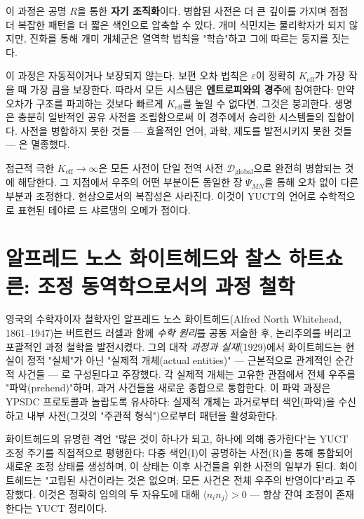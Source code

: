 \documentclass[12pt,a4paper]{article}
\newcommand{\Keff}{K_{\mathrm{eff}}}
\begin{document}
	이 과정은 공명 \(R\)을 통한 \textbf{자기 조직화}이다. 병합된 사전은 더 큰 깊이를 가지며 점점 더 복잡한 패턴을 더 짧은 색인으로 압축할 수 있다. 개미 식민지는 물리학자가 되지 않지만, 진화를 통해 개미 개체군은 열역학 법칙을 "학습"하고 그에 따르는 둥지를 짓는다.
	
	이 과정은 자동적이거나 보장되지 않는다. 보편 오차 법칙은 \(\varepsilon\)이 정확히 \(\Keff\)가 가장 작을 때 가장 큼을 보장한다. 따라서 모든 시스템은 \textbf{엔트로피와의 경주}에 참여한다: 만약 오차가 구조를 파괴하는 것보다 빠르게 \(\Keff\)를 높일 수 없다면, 그것은 붕괴한다. 생명은 충분히 일반적인 공유 사전을 조립함으로써 이 경주에서 승리한 시스템들의 집합이다. 사전을 병합하지 못한 것들 — 효율적인 언어, 과학, 제도를 발전시키지 못한 것들 — 은 멸종했다.
	
	점근적 극한 \(\Keff \to \infty\)은 모든 사전이 단일 전역 사전 \(\mathcal{D}_{\text{global}}\)으로 완전히 병합되는 것에 해당한다. 그 지점에서 우주의 어떤 부분이든 동일한 장 \(\Psi_{MN}\)을 통해 오차 없이 다른 부분과 조정한다. 현상으로서의 복잡성은 사라진다. 이것이 YUCT의 언어로 수학적으로 표현된 테야르 드 샤르댕의 오메가 점이다.
	
	\section{알프레드 노스 화이트헤드와 찰스 하트쇼른: 조정 동역학으로서의 과정 철학}
	
	영국의 수학자이자 철학자인 알프레드 노스 화이트헤드(Alfred North Whitehead, 1861–1947)는 버트런드 러셀과 함께 \emph{수학 원리}를 공동 저술한 후, 논리주의를 버리고 포괄적인 과정 철학을 발전시켰다. 그의 대작 \emph{과정과 실재}(1929)에서 화이트헤드는 현실이 정적 "실체"가 아닌 "실제적 개체(actual entities)" — 근본적으로 관계적인 순간적 사건들 — 로 구성된다고 주장했다. 각 실제적 개체는 고유한 관점에서 전체 우주를 "파악(prehend)"하며, 과거 사건들을 새로운 종합으로 통합한다. 이 파악 과정은 YPSDC 프로토콜과 놀랍도록 유사하다: 실제적 개체는 과거로부터 색인(파악)을 수신하고 내부 사전(그것의 "주관적 형식")으로부터 패턴을 활성화한다.
	
	화이트헤드의 유명한 격언 "많은 것이 하나가 되고, 하나에 의해 증가한다"는 YUCT 조정 주기를 직접적으로 평행한다: 다중 색인(I)이 공명하는 사전(R)을 통해 통합되어 새로운 조정 상태를 생성하며, 이 상태는 이후 사건들을 위한 사전의 일부가 된다. 화이트헤드는 "고립된 사건이라는 것은 없으며; 모든 사건은 전체 우주의 반영이다"라고 주장했다. 이것은 정확히 임의의 두 자유도에 대해 \(\langle n_i n_j \rangle > 0\) — 항상 잔여 조정이 존재한다는 YUCT 정리이다.
	
\end{document}
